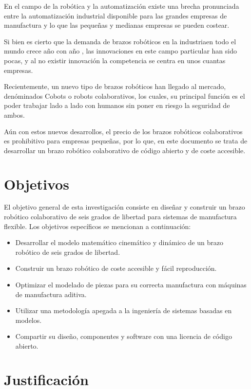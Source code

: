 En el campo de la robótica y la automatización existe una brecha pronunciada entre la automatización industrial disponible para las grandes empresas de manufactura y lo que las pequeñas y medianas empresas se pueden costear.  

Si bien es cierto que la demanda de brazos robóticos en la industriaen todo el mundo crece año con año  \cite{summary2019}, las innovaciones en este campo particular han sido pocas, y al no existir innovación la competencia se centra en unos cuantas empresas.

Recientemente, un nuevo tipo de brazos robóticos han llegado al mercado, denóminados Cobots o robots colaborativos, los cuales, su principal función es el poder trabajar lado a lado con humanos sin poner en riesgo la seguridad de ambos.

Aún con estos nuevos desarrollos, el precio de los brazos robóticos colaborativos es prohibitivo para empresas pequeñas, por lo que, en este documento se trata de desarrollar un brazo robótico colaborativo de código abierto y de coste accesible.



\section{Objetivos}

El objetivo general de esta investigación consiste en diseñar y construir un brazo robótico colaborativo de seis grados de libertad para sistemas de manufactura flexible. Los objetivos específicos se mencionan a continuación:

\begin{itemize}
\item Desarrollar el modelo matemático cinemático y dinámico de un brazo robótico de seis grados de libertad.
\item Construir un brazo robótico de coste accesible y fácil reproducción.
\item Optimizar el modelado de piezas para su correcta manufactura con máquinas de manufactura aditiva.
\item Utilizar una metodología apegada a la ingeniería de sistemas basadas en modelos.
\item Compartir su diseño, componentes y software con una licencia de código abierto. 
\end{itemize}

\section{Justificación}

